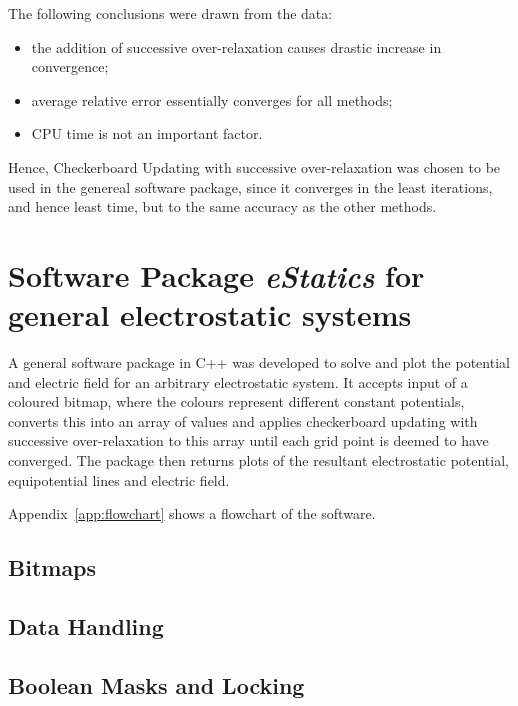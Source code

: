 \documentclass[12pt, a4paper]{article}
\begin{document}
The following conclusions were drawn from the data:
%
\begin{itemize}
\item the addition of successive over-relaxation causes drastic increase in convergence;
\item average relative error essentially converges for all methods;
\item CPU time is not an important factor.
\end{itemize}


Hence, Checkerboard Updating with successive over-relaxation was chosen to be used
in the genereal software package, since it converges in the least iterations,
and hence least time, but to the same accuracy as the other methods.

\section{Software Package \emph{eStatics} for general electrostatic systems}

A general software package in C++ was developed to solve and plot the potential and
electric field for an arbitrary electrostatic system. It accepts input of a coloured
bitmap, where the colours represent different constant potentials, converts this into
an array of values and applies checkerboard updating with successive over-relaxation
to this array until each grid point is deemed to have converged. The package then
returns plots of the resultant electrostatic potential, equipotential lines and electric
field.

Appendix~\ref{app:flowchart} shows a flowchart of the software.

\subsection{Bitmaps}


\subsection{Data Handling}


\subsection{Boolean Masks and Locking}
\label{sec:mask}

\end{document}
